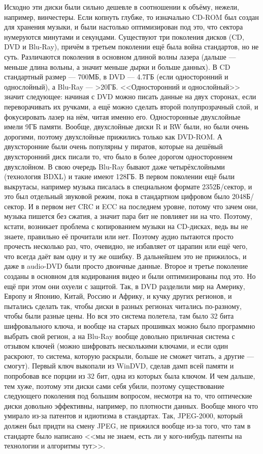 \documentclass{article}
\begin{document}
    Исходно эти диски были сильно дешевле в соотношении к объёму, нежели, например, винчестеры. Если копнуть глубже, то изначально CD-ROM был создан для хранения музыки, и были настолько оптимизирован под это, что сектора нумеруются минутами и секундами. Существуют три поколения дисков (CD, DVD и Blu-Ray), причём в третьем поколении ещё была война стандартов, но не суть. Различаются поколения в основном длиной волны лазера (дальше --- меньше длина вольны, а значит меньше дырки и больше данных). В CD стандартный размер --- 700МБ, в DVD --- 4.7ГБ (если односторонний и однослойный), а Blu-Ray --- >20ГБ. <<Односторонний и однослойный>> значит следующее: начиная с DVD можно писать данные на двух сторонах, если переворачивать их ручками, а ещё можно сделать второй полупрозрачный слой, и фокусировать лазер на нём, читая именно его. Односторонные двухслойные имели 9ГБ памяти. Вообще, двухслойные диски R и RW были, но были очень дорогими, поэтому двухслойные прижились только как DVD-ROM. А двухсторонние были очень популярны у пиратов, которые на дешёвый двухсторонний диск писали то, что было в более дорогом одностороннем двухслойном. В свою очередь Blu-Ray бывают даже четырёхслойными (технология BDXL) и такие имеют 128ГБ. В первом поколении ещё были выкрутасы, например музыка писалась в специальном формате 2352Б/сектор, и это был отдельный звуковой режим, пока в стандартном цифровом было 2048Б/сектор. И в первом нет CRC и ECC на последнем уровне, потому что зачем они, музыка пишется без сжатия, а значит пара бит не повлияет ни на что. Поэтому, кстати, возникает проблема с копированием музыки на CD-дисках, ведь вы не знаете, правильно её прочитали или нет. Поэтому аудио пытаются просто прочесть несколько раз, что, очевидно, не избавляет от царапин или ещё чего, что всегда даёт вам одну и ту же ошибку. В дальнейшем это не прижилось, и даже в audio-DVD были просто двоичные данные. Второе и третье поколение созданы в основном для кодирования видео и были оптимизированы под это. Но ещё при этом они охуели с защитой. Так, в DVD разделили мир на Америку, Европу и Японию, Китай, Россию и Африку, и кучку других регионов, и пытались сделать так, чтобы диски в разных регионах читались по-разному, чтобы были разные цены. Но вся это система полетела, там было 32 бита шифровального ключа, и вообще на старых прошивках можно было программно выбрать свой регион, а на Blu-Ray вообще довольно приличная система с отзывом ключей (можно шифровать несколькими ключами, и если один раскроют, то система, которую раскрыли, больше не сможет читать, а другие --- смогут). Первый ключ выкопали из WinDVD, сделав дамп всей памяти и попробовав все порции из 32 бит, одна из которых была ключом. И чем дальше, тем хуже, поэтому эти диски сами себя убили, поэтому существование следующего поколения под большим вопросом, несмотря на то, что оптические диски довольно эффективны, например, по плотности данных. Вообще много что умирало из-за патентов и идиотизма в стандартах. Так, JPEG-2000, который должен был придти на смену JPEG, не прижился вообще из-за того, что там в стандарте было написано <<мы не знаем, есть ли у кого-нибудь патенты на технологии и алгоритмы тут>>.
\end{document}
